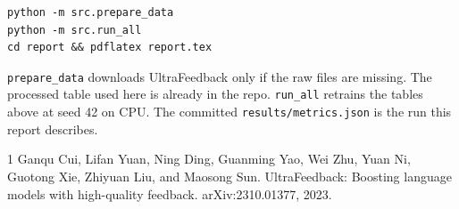 \documentclass[11pt]{article}
\begin{document}
\begin{verbatim}
python -m src.prepare_data
python -m src.run_all
cd report && pdflatex report.tex
\end{verbatim}

\texttt{prepare\_data} downloads UltraFeedback only if the raw files are missing. The processed table used here is already in the repo. \texttt{run\_all} retrains the tables above at seed 42 on CPU. The committed \texttt{results/metrics.json} is the run this report describes.

\begin{thebibliography}{1}
Ganqu Cui, Lifan Yuan, Ning Ding, Guanming Yao, Wei Zhu, Yuan Ni, Guotong Xie, Zhiyuan Liu, and Maosong Sun.
UltraFeedback: Boosting language models with high-quality feedback.
arXiv:2310.01377, 2023.
\end{thebibliography}
\end{document}
